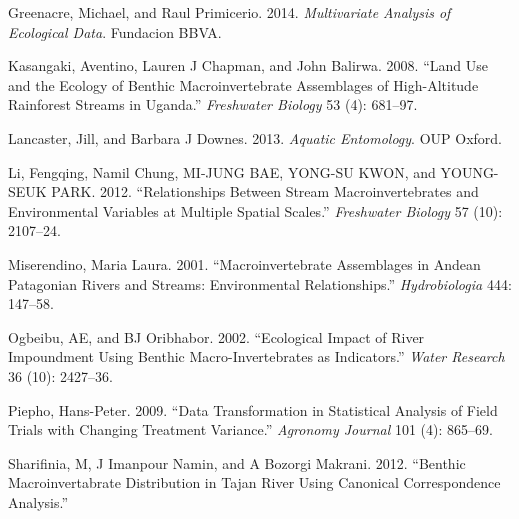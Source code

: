 \documentclass[
]{article}
\newlength{\cslhangindent}
\newlength{\cslentryspacingunit} %
\newenvironment{CSLReferences}[2] %
 {%
  \setlength{\parindent}{0pt}
  \ifodd #1
  \let\oldpar\par
  \def\par{\hangindent=\cslhangindent\oldpar}
  \fi
  \setlength{\parskip}{#2\cslentryspacingunit}
 }%
 {}
\begin{document}
\begin{CSLReferences}{1}{0}
\leavevmode{}%
Greenacre, Michael, and Raul Primicerio. 2014. \emph{Multivariate
Analysis of Ecological Data}. Fundacion BBVA.

\leavevmode{}%
Kasangaki, Aventino, Lauren J Chapman, and John Balirwa. 2008. {``Land
Use and the Ecology of Benthic Macroinvertebrate Assemblages of
High-Altitude Rainforest Streams in Uganda.''} \emph{Freshwater Biology}
53 (4): 681--97.

\leavevmode{}%
Lancaster, Jill, and Barbara J Downes. 2013. \emph{Aquatic Entomology}.
OUP Oxford.

\leavevmode{}%
Li, Fengqing, Namil Chung, MI-JUNG BAE, YONG-SU KWON, and YOUNG-SEUK
PARK. 2012. {``Relationships Between Stream Macroinvertebrates and
Environmental Variables at Multiple Spatial Scales.''} \emph{Freshwater
Biology} 57 (10): 2107--24.

\leavevmode{}%
Miserendino, Maria Laura. 2001. {``Macroinvertebrate Assemblages in
Andean Patagonian Rivers and Streams: Environmental Relationships.''}
\emph{Hydrobiologia} 444: 147--58.

\leavevmode{}%
Ogbeibu, AE, and BJ Oribhabor. 2002. {``Ecological Impact of River
Impoundment Using Benthic Macro-Invertebrates as Indicators.''}
\emph{Water Research} 36 (10): 2427--36.

\leavevmode{}%
Piepho, Hans-Peter. 2009. {``Data Transformation in Statistical Analysis
of Field Trials with Changing Treatment Variance.''} \emph{Agronomy
Journal} 101 (4): 865--69.

\leavevmode{}%
Sharifinia, M, J Imanpour Namin, and A Bozorgi Makrani. 2012. {``Benthic
Macroinvertabrate Distribution in Tajan River Using Canonical
Correspondence Analysis.''}

\end{CSLReferences}
\end{document}
